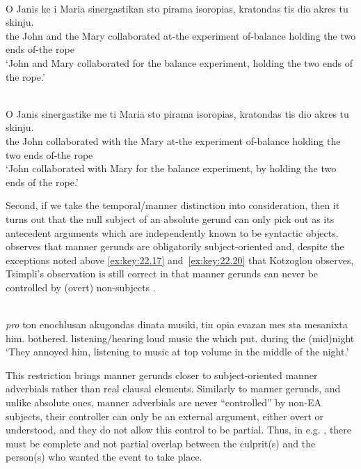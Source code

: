 \documentclass[output=paper]{langsci/langscibook}
\begin{document}
\ea%
    \label{ex:key:22.23} \\
    \gll    O  Janis   ke   i  Maria   sinergastikan sto   pirama     isoropias, kratondas   tis   dio akres  tu skinju.\\
            the John    and  the  Mary  collaborated  at-the  experiment  of-balance holding       the   two ends   of-the  rope\\
    \glt    \enquote*{John and Mary collaborated for the balance experiment, holding the two ends of the  rope.}
\z

\ea%
    \label{ex:key:22.24} \\
    \gll    O      Janis sinergastike   me   ti Maria sto   pirama   isoropias, kratondas   tis   dio  akres  tu   skinju.\\
            the John  collaborated  with  the  Mary  at-the  experiment of-balance holding        the  two  ends  of-the  rope\\
    \glt    \enquote*{John collaborated with Mary for the balance experiment, by holding the two ends of the rope.}
\z

Second, if we take the temporal/manner distinction into consideration, then it
turns out that the null subject of an absolute gerund can only pick out as its
antecedent arguments which are independently known to be syntactic objects.
\citet{Tsimpli2000} observes that manner gerunds are obligatorily
subject-oriented and, despite the exceptions noted above \eqref{ex:key:22.17}
and~\eqref{ex:key:22.20} that Kotzoglou observes, Tsimpli’s observation is
still correct in that manner gerunds can never be controlled by (overt)
non-subjects .

\ea%
    \label{ex:key:22.25} \\
    \gll    \emph{pro} ton     enochlusan   akugondas dinata musiki, tin     opia   evazan     mes     sta    mesanixta\\
            {} him.\Cl{}  bothered.\Tpl{}  listening/hearing  loud     music the which   put.\Tpl{}  during   the  (mid)night\\
    \glt    \enquote*{They annoyed him, listening to music at top volume in the middle of the night.}
\z

This restriction brings manner gerunds closer to subject-oriented manner
adverbials rather than real clausal elements. Similarly to manner gerunds, and
unlike absolute ones, manner adverbials are never “controlled” by non-\gls{EA}
subjects, their controller can only be an external argument, either overt or
understood, and they do not allow this control to be partial.  Thus, in e.g.
, there must be complete and not partial overlap between the
culprit(s) and the person(s) who wanted the event to take place.
\end{document}
